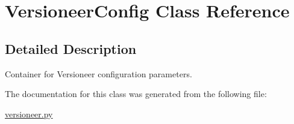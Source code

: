 \hypertarget{classversioneer_1_1VersioneerConfig}{}\section{Versioneer\+Config Class Reference}
\label{classversioneer_1_1VersioneerConfig}


\subsection{Detailed Description}
\begin{DoxyVerb}Container for Versioneer configuration parameters.\end{DoxyVerb}
 

The documentation for this class was generated from the following file\+:\begin{DoxyCompactItemize}
\item 
\hyperlink{versioneer_8py}{versioneer.\+py}\end{DoxyCompactItemize}
